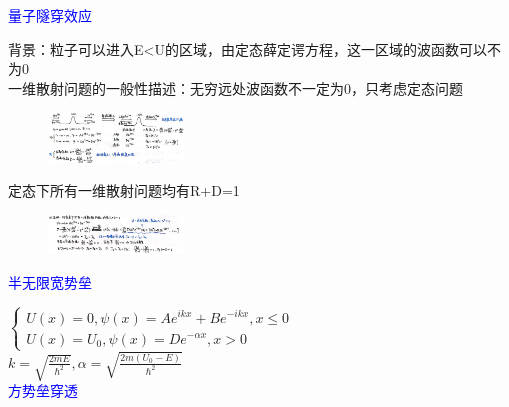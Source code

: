 \documentclass[a4paper,8pt]{extarticle} %
\newcommand{\bluetext}[1]{\textcolor{blue}{#1}}
\begin{document}
\begin{multicols}{3}
\bluetext{量子隧穿效应}

背景：粒子可以进入E<U的区域，由定态薛定谔方程，这一区域的波函数可以不为0\\
一维散射问题的一般性描述：无穷远处波函数不一定为0，只考虑定态问题\\
\begin{figure}[H]
    \vspace{-0.5cm}
    \centering
    \includegraphics[width=0.32\textwidth]{images/32.png}
    \vspace{-0.6cm}
\end{figure}
定态下所有一维散射问题均有R+D=1\\
\begin{figure}[H]
    \vspace{-0.5cm}
    \centering
    \includegraphics[width=0.32\textwidth]{images/33.png}
    \vspace{-0.6cm}
\end{figure}

\bluetext{半无限宽势垒}

$\begin{cases}
    U(x) = 0, \psi (x)=Ae^{ikx}+Be^{-ikx}, x \leq 0 \\
    U(x) = U_0, \psi (x)=De^{-\alpha x}, x > 0
    \end{cases}$\\
$k=\sqrt{\frac{2mE}{\hbar^2}},\alpha=\sqrt{\frac{2m(U_0-E)}{\hbar^2}}$\\

\bluetext{方势垒穿透}


\end{multicols}
\end{document}

